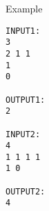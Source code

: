 Example
\begin{verbatim}
INPUT1:
3
2 1 1
1
0

OUTPUT1:
2

INPUT2:
4
1 1 1 1
1 0

OUTPUT2:
4\end{verbatim}